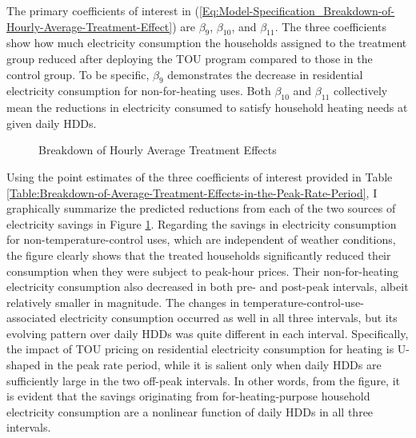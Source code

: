 The primary coefficients of interest in (\ref{Eq:Model-Specification_Breakdown-of-Hourly-Average-Treatment-Effect}) are $\beta_{9}$, $\beta_{10}$, and $\beta_{11}$. The three coefficients show how much electricity consumption the households assigned to the treatment group reduced after deploying the TOU program compared to those in the control group. To be specific, $\beta_{9}$ demonstrates the decrease in residential electricity consumption for non-for-heating uses. Both $\beta_{10}$ and $\beta_{11}$ collectively mean the reductions in electricity consumed to satisfy household heating needs at given daily HDDs. 

\begin{figure}[!th]
\centering
\caption{Breakdown of Hourly Average Treatment Effects}
\label{Figure:Breakdown-of-Hourly-ATEs-in-the-Peak-Rate-Period}
\end{figure}

Using the point estimates of the three coefficients of interest provided in Table \ref{Table:Breakdown-of-Average-Treatment-Effects-in-the-Peak-Rate-Period}, I graphically summarize the predicted reductions from each of the two sources of electricity savings in Figure \ref{Figure:Breakdown-of-Hourly-ATEs-in-the-Peak-Rate-Period}. Regarding the savings in electricity consumption for non-temperature-control uses, which are independent of weather conditions, the figure clearly shows that the treated households significantly reduced their consumption when they were subject to peak-hour prices. Their non-for-heating electricity consumption also decreased in both pre- and post-peak intervals, albeit relatively smaller in magnitude. The changes in temperature-control-use-associated electricity consumption occurred as well in all three intervals, but its evolving pattern over daily HDDs was quite different in each interval. Specifically, the impact of TOU pricing on residential electricity consumption for heating is U-shaped in the peak rate period, while it is salient only when daily HDDs are sufficiently large in the two off-peak intervals. In other words, from the figure, it is evident that the savings originating from for-heating-purpose household electricity consumption are a nonlinear function of daily HDDs in all three intervals.

